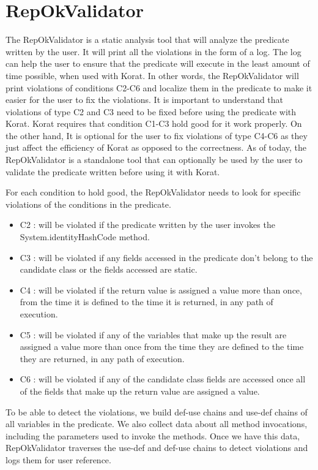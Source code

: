 \section{RepOkValidator}
\label{sec:repokvalidator}
The RepOkValidator is a static analysis tool that will analyze the predicate written by the user. It will print all the violations in the form of a log. The log can help the user to ensure that the predicate will execute in the least amount of time possible, when used with Korat. In other words, the RepOkValidator will print violations of conditions C2-C6 and localize them in the predicate to make it easier for the user to fix the violations. It is important to understand that violations of type C2 and C3 need to be fixed before using the predicate with Korat. Korat requires that condition C1-C3 hold good for it work properly. On the other hand, It is optional for the user to fix violations of type C4-C6 as they just affect the efficiency of Korat as opposed to the correctness. As of today, the RepOkValidator is a standalone tool that can optionally be used by the user to validate the predicate written before using it with Korat.

\para
For each condition to hold good, the RepOkValidator needs to look for specific violations of the conditions in the predicate. 
\begin{itemize}
\item C2 : will be violated if the predicate written by the user invokes the System.identityHashCode method.
\item C3 : will be violated if any fields accessed in the predicate don’t belong to the candidate class or the fields accessed are static.
\item C4 : will be violated if the return value is assigned a value more than once, from the time it is defined to the time it is returned, in any path of execution.
\item C5 : will be violated if any of the variables that make up the result are assigned a value more than once from the time they are defined to the time they are returned, in any path of execution.
\item C6 : will be violated if any of the candidate class fields are accessed once all of the fields that make up the return value are assigned a value.
\end{itemize}

\para
To be able to detect the violations, we build def-use chains and use-def chains of all variables in the predicate. We also collect data about all method invocations, including the parameters used to invoke the methods. Once we have this data, RepOkValidator traverses the use-def and def-use chains to detect violations and logs them for user reference.


